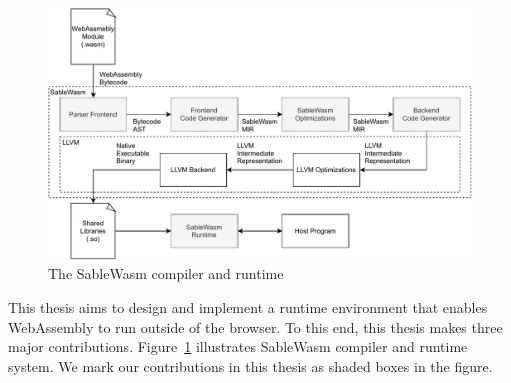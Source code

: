 \begin{figure}
    \centering
    \includegraphics[width=\textwidth]{Images/design}
    \caption{The SableWasm compiler and runtime}
    \label{fig:design}
\end{figure}

This thesis aims to design and implement a runtime environment that enables
WebAssembly to run outside of the browser. To this end, this thesis makes three
major contributions. Figure~\ref{fig:design} illustrates SableWasm compiler and
runtime system. We mark our contributions in this thesis as shaded boxes in the
figure.


